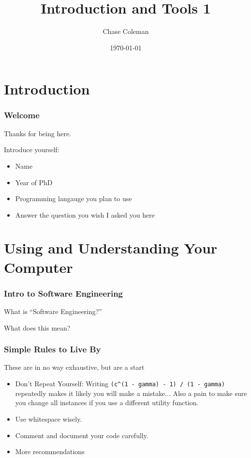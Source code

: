 \documentclass[10pt]{beamer}
\title{Introduction and Tools 1}
\author{Chase Coleman}
\institute{NYU Stern}
\date[]{\today}
\begin{document}
\begin{frame}
  \thispagestyle{empty}
  \titlepage
\end{frame}


\section{Introduction}

\begin{frame} \frametitle{Welcome}

  Thanks for being here.

  Introduce yourself:
  \begin{itemize}
    \item Name
    \item Year of PhD
    \item Programming langauge you plan to use
    \item Answer the question you wish I asked you here
  \end{itemize}
\end{frame}


\section{Using and Understanding Your Computer}

\begin{frame} \frametitle{Intro to Software Engineering}
  What is ``Software Engineering?''


  What does this mean?


\end{frame}

\begin{frame} \frametitle{Simple Rules to Live By}
  These are in no way exhaustive, but are a start
  \begin{itemize}
    \item Don't Repeat Yourself: Writing \lstinline{(c^(1 - gamma) - 1) / (1 - gamma)} repeatedly makes it likely you will make a mistake... Also a pain to make sure you change all instances if you use a different utility function.
    \item Use whitespace wisely.
    \item Comment and document your code carefully.
    \item More recommendations
  \end{itemize}
\end{frame}
\end{document}
